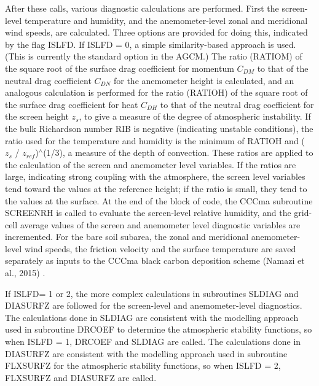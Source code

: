 After these calls, various diagnostic calculations are performed. First the screen-\/level temperature and humidity, and the anemometer-\/level zonal and meridional wind speeds, are calculated. Three options are provided for doing this, indicated by the flag I\+S\+L\+F\+D. If I\+S\+L\+F\+D = 0, a simple similarity-\/based approach is used. (This is currently the standard option in the A\+G\+C\+M.) The ratio (R\+A\+T\+I\+O\+M) of the square root of the surface drag coefficient for momentum $C_{DM}$ to that of the neutral drag coefficient $C_{DN}$ for the anemometer height is calculated, and an analogous calculation is performed for the ratio (R\+A\+T\+I\+O\+H) of the square root of the surface drag coefficient for heat $C_{DH}$ to that of the neutral drag coefficient for the screen height $z_s$, to give a measure of the degree of atmospheric instability. If the bulk Richardson number R\+I\+B is negative (indicating unstable conditions), the ratio used for the temperature and humidity is the minimum of R\+A\+T\+I\+O\+H and ( $z_s$ / $z_{ref}$)$^\wedge$(1/3), a measure of the depth of convection. These ratios are applied to the calculation of the screen and anemometer level variables. If the ratios are large, indicating strong coupling with the atmosphere, the screen level variables tend toward the values at the reference height; if the ratio is small, they tend to the values at the surface. At the end of the block of code, the C\+C\+Cma subroutine S\+C\+R\+E\+E\+N\+R\+H is called to evaluate the screen-\/level relative humidity, and the grid-\/cell average values of the screen and anemometer level diagnostic variables are incremented. For the bare soil subarea, the zonal and meridional anemometer-\/level wind speeds, the friction velocity and the surface temperature are saved separately as inputs to the C\+C\+Cma black carbon deposition scheme (Namazi et al., 2015) \cite{Namazi2015-wz}.

If I\+S\+L\+F\+D= 1 or 2, the more complex calculations in subroutines S\+L\+D\+I\+A\+G and D\+I\+A\+S\+U\+R\+F\+Z are followed for the screen-\/level and anemometer-\/level diagnostics. The calculations done in S\+L\+D\+I\+A\+G are consistent with the modelling approach used in subroutine D\+R\+C\+O\+E\+F to determine the atmospheric stability functions, so when I\+S\+L\+F\+D = 1, D\+R\+C\+O\+E\+F and S\+L\+D\+I\+A\+G are called. The calculations done in D\+I\+A\+S\+U\+R\+F\+Z are consistent with the modelling approach used in subroutine F\+L\+X\+S\+U\+R\+F\+Z for the atmospheric stability functions, so when I\+S\+L\+F\+D = 2, F\+L\+X\+S\+U\+R\+F\+Z and D\+I\+A\+S\+U\+R\+F\+Z are called.

